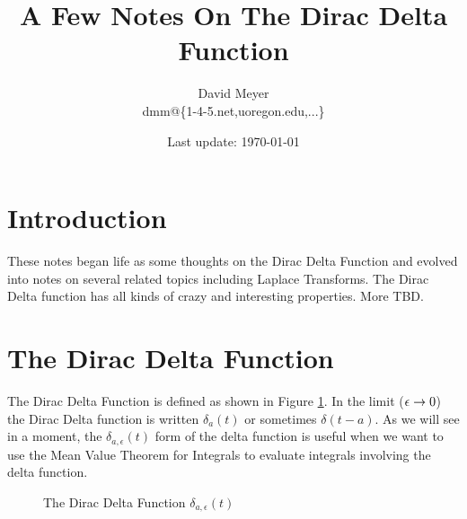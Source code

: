 \documentclass{article}
\title{A Few Notes On The Dirac Delta Function}
\author{David Meyer \\ dmm@\{1-4-5.net,uoregon.edu,...\}}
\date{Last update: \today}							%
\theoremstyle{definition}
\begin{document}
\maketitle

\section{Introduction}
These notes began life as some thoughts on the Dirac Delta Function and evolved into notes on several related topics including  Laplace Transforms. The 
Dirac Delta function has all kinds of crazy and interesting properties. More TBD.

\section{The Dirac Delta Function}
The Dirac Delta Function is defined as shown in Figure \ref{fig:delta}. In the limit ($\mathlarger{\epsilon} \to 0$) the
 Dirac Delta function is written $\delta_a(t)$ or sometimes $\delta(t - a)$. As we will see in a moment, the $\delta_{a,\epsilon}(t)$ form of the delta function
 is useful when we want to use the Mean Value Theorem for Integrals \cite{wiki:meam_value_theorem_for_integrals} to evaluate integrals involving the delta function.
 
\bigskip

\begin{figure}[H]
  \centering
  \caption{The Dirac Delta Function $\delta_{a,\epsilon}(t)$}
  \label{fig:delta}
\end{figure}
\end{document}
